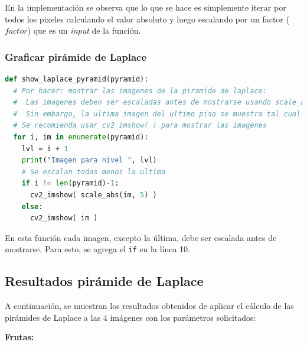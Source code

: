\documentclass[12pt, letterpaper]{article}
\begin{document}
\par En la implementación se observa que lo que se hace es simplemente iterar por todos los pixeles calculando el valor absoluto y luego escalando por un factor ($factor$) que es un \textit{input} de la función. 

\subsubsection{Graficar pirámide de Laplace}
\begin{lstlisting}[language=Python, label = showlpCode, caption=Función para graficar pirámide de Laplace.]
def show_laplace_pyramid(pyramid):
  # Por hacer: mostrar las imagenes de la piramide de laplace:
  #  Las imagenes deben ser escaladas antes de mostrarse usando scale_abs
  #  Sin embargo, la ultima imagen del ultimo piso se muestra tal cual
  # Se recomienda usar cv2_imshow( ) para mostrar las imagenes
  for i, im in enumerate(pyramid):
    lvl = i + 1
    print("Imagen para nivel ", lvl)
    # Se escalan todas menos la ultima
    if i != len(pyramid)-1:
      cv2_imshow( scale_abs(im, 5) )
    else:
      cv2_imshow( im ) 
\end{lstlisting}

\par En esta función cada imagen, excepto la última, debe ser escalada antes de mostrarse. Para esto, se agrega el \texttt{if} en la línea 10. 

\subsection{Resultados pirámide de Laplace}
A continuación, se muestran los resultados obtenidos de aplicar el cálculo de las pirámides de Laplace a las 4 imágenes con los parámetros solicitados:

\par \textbf{Frutas:}
\end{document}
